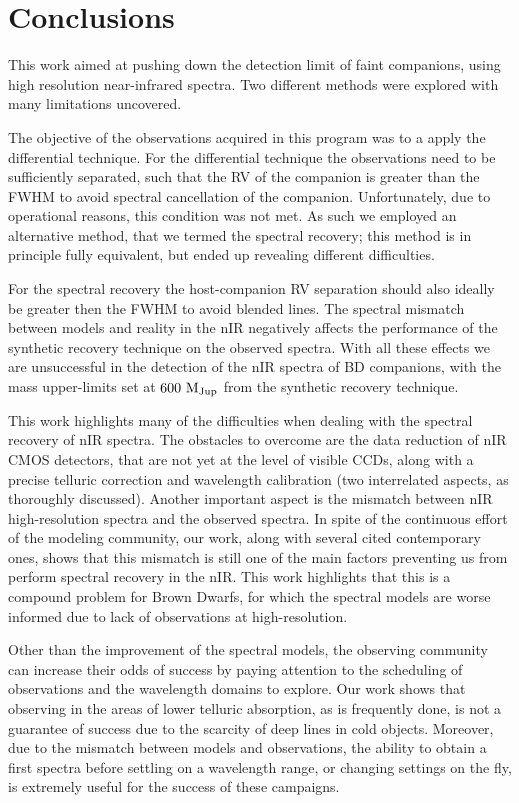 \documentclass[fleqn,usenatbib]{mnras}
\begin{document}
\section{Conclusions}
\label{sec:conclusions}
This work aimed at pushing down the detection limit of faint companions, using high resolution near-infrared spectra. Two different methods were explored with many limitations uncovered. 

The objective of the observations acquired in this program was to a apply the differential technique. For the differential technique the observations need to be sufficiently separated, such that the RV of the companion is greater than the FWHM to avoid spectral cancellation of the companion. Unfortunately, due to operational reasons, this condition was not met. As such we employed an alternative method, that we termed the spectral recovery; this method is in principle fully equivalent, but ended up revealing different difficulties.

For the spectral recovery the host-companion RV separation should also ideally be greater then the FWHM to avoid blended lines. The spectral mismatch between models and reality in the nIR negatively affects the performance of the synthetic recovery technique on the observed spectra. With all these effects we are unsuccessful in the detection of the nIR spectra of BD companions,  with the mass upper-limits set at \(\rm 600~M_{Jup}\) from the synthetic recovery technique.

This work highlights many of the difficulties when dealing with the spectral recovery of nIR spectra. The obstacles to overcome are the data reduction of nIR CMOS detectors, that are not yet at the level of visible CCDs, along with a precise telluric correction and wavelength calibration (two interrelated aspects, as thoroughly discussed). Another important aspect is the mismatch between nIR high-resolution spectra and the observed spectra. In spite of the continuous effort of the modeling community, our work, along with several cited contemporary ones, shows that this mismatch is still one of the main factors preventing us from perform spectral recovery in the nIR. This work highlights that this is a compound problem for Brown Dwarfs, for which the spectral models are worse informed due to lack of observations at high-resolution.

Other than the improvement of the spectral models, the observing community can increase their odds of success by paying attention to the scheduling of observations and the wavelength domains to explore. Our work shows that observing in the areas of lower telluric absorption, as is frequently done, is not a guarantee of success due to the scarcity of deep lines in cold objects. Moreover, due to the mismatch between models and observations, the ability to obtain a first spectra before settling on a wavelength range, or changing settings on the fly, is extremely useful for the success of these campaigns.
\end{document}
